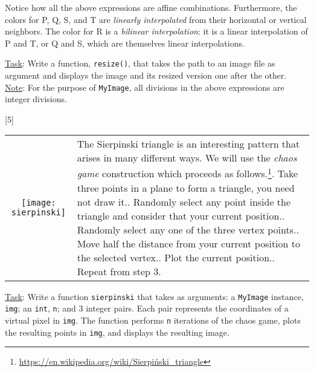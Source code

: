 \documentclass[addpoints]{exam}
\begin{document}
\begin{questions}
  Notice how all the above expressions are affine combinations. Furthermore, the colors for P, Q, S, and T are \textit{linearly interpolated} from their horizontal or vertical neighbors. The color for R is a \textit{bilinear interpolation}: it is a linear interpolation of P and T, or Q and S, which are themselves linear interpolations.

  \underline{Task}: Write a function, \texttt{resize()}, that takes the path to an image file as argument and displays the image and its resized version one after the other.\\
  \underline{Note}: For the purpose of \texttt{MyImage}, all divisions in the above expressions are integer divisions.
  
  
[5]

  \begin{tabularx}{\linewidth}{cX}
    \texttt{[image: sierpinski]}
    & The Sierpinski triangle is an interesting pattern that arises in many different ways. We will use the \textit{chaos game} construction which proceeds as follows.\footnote{\url{https://en.wikipedia.org/wiki/Sierpiński_triangle}}\newline
    1. Take three points in a plane to form a triangle, you need not draw it.\newline
    2. Randomly select any point inside the triangle and consider that your current position.\newline
    3. Randomly select any one of the three vertex points.\newline
    4. Move half the distance from your current position to the selected vertex.\newline
    5. Plot the current position.\newline
    6. Repeat from step 3.
  \end{tabularx}

  \underline{Task}: Write a function {\tt sierpinski} that takes as arguments: a \texttt{MyImage} instance, \texttt{img}; an \texttt{int}, \texttt{n}; and 3 integer pairs. Each pair represents the coordinates of a virtual pixel in \texttt{img}. The function performs \texttt{n} iterations of the chaos game, plots the resulting points in \texttt{img}, and displays the resulting image.
  
  
\end{questions}
\end{document}
